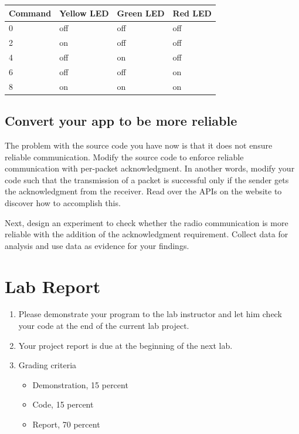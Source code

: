 \documentclass[letterpaper,12pt]{article}
\begin{document}
    \begin{table}[htbp]
    \begin{center}
        \begin{tabular}{ |l|l|l|l| }
            \hline
            \textbf{Command} & \textbf{Yellow LED} & \textbf{Green LED} & \textbf{Red LED} \\ \hline
            0 & off & off & off \\ \hline
            2 & on & off & off \\ \hline
            4 & off & on & off \\ \hline
            6 & off & off & on \\ \hline
            8 & on & on & on \\ \hline
        \end{tabular}
    \end{center}
    \end{table}

\subsection*{Convert your app to be more reliable}


    The problem with the source code you have now is that it does not ensure reliable communication.
    Modify the source code to enforce reliable communication with per-packet acknowledgment.
    In another words, modify your code such that the transmission of a packet is successful
    only if the sender gets the acknowledgment from the receiver. Read over the APIs on the website to
    discover how to accomplish this.

    Next, design an experiment to check whether the radio communication is more reliable with
    the addition of the acknowledgment requirement. Collect data for analysis and use data
    as evidence for your findings.
\section*{Lab Report}
\begin{enumerate}
   \item Please demonstrate your program to the lab instructor and let him check your code at the end of the current lab project.
   \item Your project report is due at the beginning of the next lab.
   \item Grading criteria
      \begin{itemize}
         \item Demonstration, 15 percent
         \item Code, 15 percent
         \item Report, 70 percent
      \end{itemize}
\end{enumerate}
\end{document}
